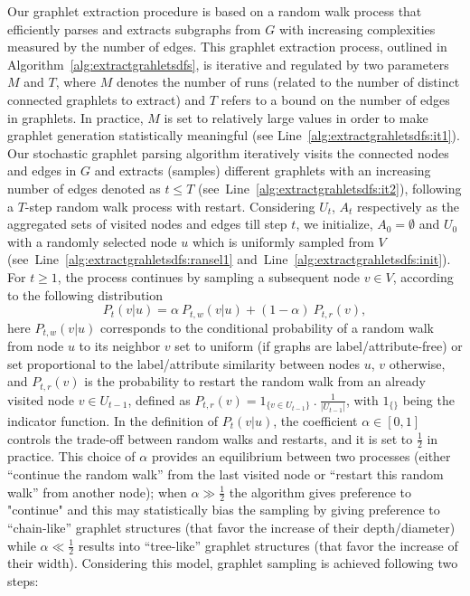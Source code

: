 \documentclass[journal]{IEEEtran}
\theoremstyle{definition}
\newcommand{\alg}[1]{Algorithm~\ref{#1}}
\newcommand{\lin}[1]{Line~\ref{#1}}
\begin{document}
Our graphlet extraction procedure is based on a random walk process that efficiently parses and extracts subgraphs from $G$ with increasing complexities measured by the number of edges. This graphlet extraction process, outlined in \alg{alg:extractgrahletsdfs}, is iterative and regulated by two parameters $M$ and $T$, where $M$ denotes the number of runs (related to the number of distinct connected graphlets to extract) and $T$ refers to a bound on the number of edges in graphlets. In practice, $M$ is set to relatively large values in order to make graphlet generation statistically meaningful (see \lin{alg:extractgrahletsdfs:it1}). Our stochastic graphlet parsing algorithm iteratively visits the connected nodes and edges in $G$ and extracts (samples) different graphlets with an increasing number of edges denoted as $t \leq T$ (see~\lin{alg:extractgrahletsdfs:it2}), following a $T$-step random walk process with restart. Considering $U_t$, $A_t$ respectively as the aggregated sets of visited nodes and edges till step $t$, we initialize, $A_0=\emptyset$ and $U_0$ with a randomly selected node $u$ which is uniformly sampled from $V$ (see~\lin{alg:extractgrahletsdfs:ransel1} and~\lin{alg:extractgrahletsdfs:init}). For $t \geq 1$, the process continues by sampling a subsequent node $v \in V$, according to the following distribution 
\begin{equation*}
P_{t}(v|u) = \alpha \ P_{t,w}(v|u) + (1-\alpha) \ P_{t,r}(v), 
\end{equation*}
here $P_{t,w}(v|u)$ corresponds to the conditional probability of a random walk from node $u$ to its neighbor $v$ {set to uniform (if graphs are label/attribute-free) or set proportional to the label/attribute similarity between nodes $u$, $v$ otherwise}, and $P_{t,r}(v)$ is the probability to restart the random walk from an already visited node $v \in U_{t-1}$, defined as $P_{t,r}(v) = 1_{\{v \in U_{t-1} \}} \ . \ \frac{1}{|U_{t-1}|}$, with $1_{\{\}}$ being the indicator function. In the definition of $P_{t}(v|u)$, the coefficient $\alpha \in [0,1]$ controls the trade-off between random walks and restarts, and it is set to $\frac{1}{2}$ in practice. This choice of $\alpha$ provides an equilibrium between two processes (either ``continue the random walk'' from the last visited node or ``restart this random walk'' from another node); when $\alpha \gg \frac{1}{2}$ the algorithm gives preference to "continue" and this may statistically bias the sampling by giving preference to ``chain-like'' graphlet structures (that favor the increase of their depth/diameter) while $\alpha \ll \frac{1}{2}$ results into ``tree-like'' graphlet structures (that favor the increase of their width). Considering this model, graphlet sampling is achieved following two steps:
\end{document}
